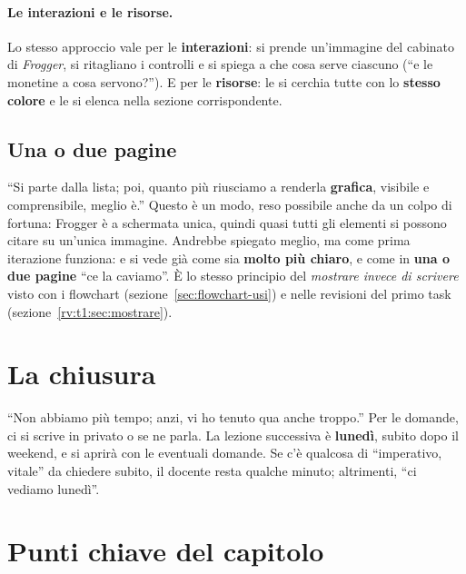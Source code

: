 \paragraph{Le interazioni e le risorse.} Lo stesso approccio vale per le
\textbf{interazioni}: si prende un'immagine del cabinato di \emph{Frogger}, si
ritagliano i controlli e si spiega a che cosa serve ciascuno (``e le
monetine a cosa servono?''). E per le \textbf{risorse}: le si cerchia tutte
con lo \textbf{stesso colore} e le si elenca nella sezione corrispondente.

\subsection{Una o due pagine}

``Si parte dalla lista; poi, quanto più riusciamo a renderla
\textbf{grafica}, visibile e comprensibile, meglio è.'' Questo è un modo, reso
possibile anche da un colpo di fortuna: Frogger è a schermata unica, quindi
quasi tutti gli elementi si possono citare su un'unica immagine. Andrebbe
spiegato meglio, ma come prima iterazione funziona: e si vede già come sia
\textbf{molto più chiaro}, e come in \textbf{una o due pagine} ``ce la
caviamo''. È lo stesso principio del \emph{mostrare invece di scrivere} visto
con i flowchart (sezione~\ref{sec:flowchart-usi}) e nelle revisioni del
primo task (sezione~\ref{rv:t1:sec:mostrare}).

\section{La chiusura}
\label{gd9:sec:chiusura}

``Non abbiamo più tempo; anzi, vi ho tenuto qua anche troppo.'' Per le
domande, ci si scrive in privato o se ne parla. La lezione successiva è
\textbf{lunedì}, subito dopo il weekend, e si aprirà con le eventuali
domande. Se c'è qualcosa di ``imperativo, vitale'' da chiedere subito, il
docente resta qualche minuto; altrimenti, ``ci vediamo lunedì''.

\section*{Punti chiave del capitolo}

